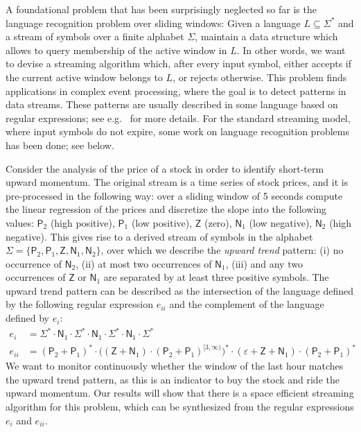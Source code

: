 \documentclass{theoretics}
\begin{document}
A foundational problem that has been surprisingly neglected
so far is the language recognition problem over sliding windows:
Given a language $L \subseteq \Sigma^*$ and a stream of symbols over a finite alphabet $\Sigma$,
maintain a data structure which allows to query membership
of the active window in $L$.
In other words, we want to devise a streaming algorithm
which, after every input symbol, either accepts if the current active window belongs to $L$,
or rejects otherwise. This problem finds applications in complex event processing, where
the goal is to detect patterns in data streams. These patterns are usually described in some 
language based on regular expressions; see e.g.~\cite{CuMa12,ZhangDI14} for more details. 
For the standard streaming model, where input symbols do not expire,
some work on language recognition problems has been done; see  below.

\newcommand{\SP}{\textsf{P}}
\newcommand{\SZ}{\textsf{Z}}
\newcommand{\SN}{\textsf{N}}

\begin{example} 
Consider the analysis of the price of a stock in order to identify short-term upward momentum.
The original stream is a time series of stock prices, and it is pre-processed in the following way:
over a sliding window of 5 seconds compute the linear regression of the prices and discretize the slope
into the following values: $\SP_2$ (high positive), $\SP_1$ (low positive), $\SZ$ (zero), $\SN_1$ (low negative),
$\SN_2$ (high negative). This gives rise to a derived stream of symbols in the alphabet $\Sigma = \{\SP_2,\SP_1,\SZ,\SN_1,\SN_2\}$,
over which we describe the {\em upward trend} pattern:
(i) no occurrence of $\SN_2$,
(ii) at most two occurrences of $\SN_1$,
(iii) and any two occurrences of $\SZ$ or $\SN_1$ are separated by at least three positive symbols.
The upward trend pattern can be described as the intersection of the language defined 
 by the following regular expression $e_{ii}$ and the complement of the language
 defined by  $e_{i}$:
\begin{align*}
	e_{i} &= \Sigma^* \cdot \SN_1 \cdot \Sigma^* \cdot \SN_1 \cdot \Sigma^* \cdot \SN_1 \cdot \Sigma^* \\
	e_{ii} &= (\SP_2 + \SP_1)^* \cdot \big( (\SZ + \SN_1) \cdot (\SP_2 + \SP_1)^{[3,\infty)} \big)^* \cdot (\varepsilon + \SZ + \SN_1) \cdot (\SP_2 + \SP_1)^*
\end{align*}
We want to monitor continuously whether the window of the last hour matches the upward trend pattern,
as this is an indicator to buy the stock and ride the upward momentum.
Our results will show that there is a space efficient streaming algorithm for this problem,
which can be synthesized from the regular expressions $e_i$ and $e_{ii}$.
\end{example}
\end{document}
